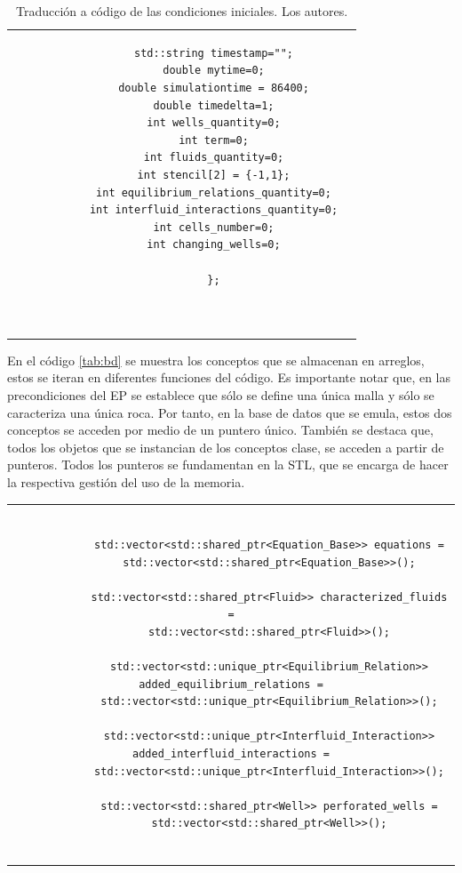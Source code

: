 \begin{appendix}
\begin{table}[h]
\begin{tabular}{cc}
\begin{tiny}
\begin{lstlisting}
			std::string timestamp="";
			double mytime=0;
			double simulationtime = 86400;
			double timedelta=1;
			int wells_quantity=0;
			int term=0;
			int fluids_quantity=0;
			int stencil[2] = {-1,1};
			int equilibrium_relations_quantity=0;
			int interfluid_interactions_quantity=0;
			int cells_number=0;
			int changing_wells=0;
			
			};
			
			
			\end{lstlisting}
		\end{tiny}
	\end{tabular}
	\label{tab:InitialConditions}
	\caption[Traducción a código de las condiciones iniciales.]{Traducción a código de las condiciones iniciales. Los autores.}
\end{table}

En el código \ref{tab:bd} se muestra los conceptos que se almacenan en arreglos, estos se iteran en diferentes funciones del código. Es importante notar que, en las precondiciones del EP se establece que sólo se define una única malla y sólo se caracteriza una única roca. Por tanto, en la base de datos que se emula, estos dos conceptos se acceden por medio de un puntero único. También se destaca que, todos los objetos que se instancian de los conceptos clase, se acceden a partir de punteros. Todos los punteros se fundamentan en la STL, que se encarga de hacer la respectiva gestión del uso de la memoria.\\

\begin{table}
	\begin{tabular}{c}
		\begin{tiny}
			\begin{lstlisting}
			
			std::vector<std::shared_ptr<Equation_Base>> equations =
			std::vector<std::shared_ptr<Equation_Base>>();
			
			std::vector<std::shared_ptr<Fluid>> characterized_fluids =
			std::vector<std::shared_ptr<Fluid>>();
			
			std::vector<std::unique_ptr<Equilibrium_Relation>> added_equilibrium_relations =
			std::vector<std::unique_ptr<Equilibrium_Relation>>();
			
			std::vector<std::unique_ptr<Interfluid_Interaction>> added_interfluid_interactions =
			std::vector<std::unique_ptr<Interfluid_Interaction>>();
			
			std::vector<std::shared_ptr<Well>> perforated_wells =
			std::vector<std::shared_ptr<Well>>();
			

\end{lstlisting}
\end{tiny}
\end{tabular}
\end{table}
\end{appendix}
